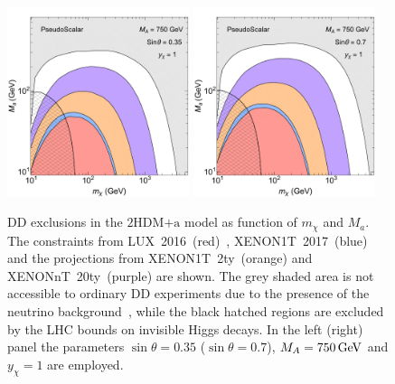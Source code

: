 \documentclass[a4paper, 11pt,notoc]{article}
\newcommand{\hdma}{\ensuremath{\textrm{2HDM+a}}\xspace}
\begin{document}
\begin{figure}[t!]
\begin{center}
\includegraphics[width=0.475\textwidth]{PseudoS035.pdf} \quad 
\includegraphics[width=0.475\textwidth]{PseudoS07.pdf}
\vspace{4mm}
\caption{DD exclusions in the \hdma model as function of $m_\chi$ and $M_a$.  The constraints from LUX~2016~(red)~\cite{Akerib:2016vxi}, XENON1T~2017~(blue)~\cite{Aprile:2017iyp} and the projections from XENON1T~2ty~(orange) and  XENONnT~20ty~(purple) \cite{Aprile:2015uzo} are shown. The grey shaded area is not accessible to ordinary DD experiments due to the presence of the neutrino background~\cite{Billard:2013qya}, while the   black hatched regions are excluded by the LHC bounds on invisible Higgs decays. In the left (right) panel the parameters $\sin \theta = 0.35$ ($\sin \theta = 0.7$), $M_A = 750 \, {\rm GeV}$ and $y_\chi = 1$ are employed.} 
\label{fig:PSDD}
\end{center}
\end{figure} 
\end{document}
